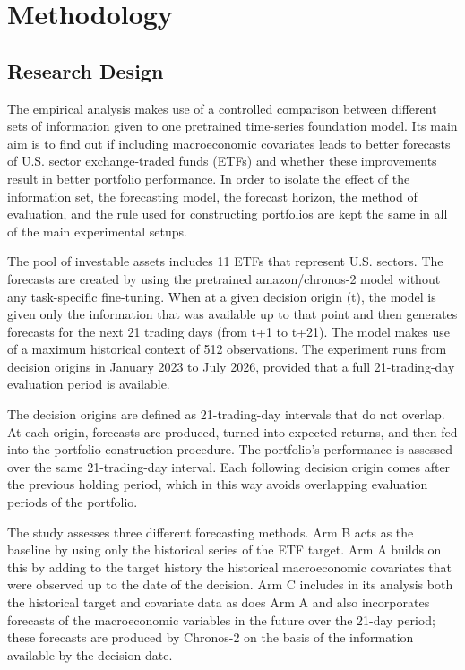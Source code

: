 \documentclass[12pt,a4paper,twoside,openany]{book}
\begin{document}
\chapter{Methodology}\label{methodology}

\section{Research Design}\label{research-design}

The empirical analysis makes use of a controlled comparison between different sets of information given to one pretrained time-series foundation model. Its main aim is to find out if including macroeconomic covariates leads to better forecasts of U.S. sector exchange-traded funds (ETFs) and whether these improvements result in better portfolio performance. In order to isolate the effect of the information set, the forecasting model, the forecast horizon, the method of evaluation, and the rule used for constructing portfolios are kept the same in all of the main experimental setups.

The pool of investable assets includes 11 ETFs that represent U.S. sectors. The forecasts are created by using the pretrained amazon/chronos-2 model without any task-specific fine-tuning. When at a given decision origin (t), the model is given only the information that was available up to that point and then generates forecasts for the next 21 trading days (from t+1 to t+21). The model makes use of a maximum historical context of 512 observations. The experiment runs from decision origins in January 2023 to July 2026, provided that a full 21-trading-day evaluation period is available.

The decision origins are defined as 21-trading-day intervals that do not overlap. At each origin, forecasts are produced, turned into expected returns, and then fed into the portfolio-construction procedure. The portfolio's performance is assessed over the same 21-trading-day interval. Each following decision origin comes after the previous holding period, which in this way avoids overlapping evaluation periods of the portfolio.

The study assesses three different forecasting methods. Arm B acts as the baseline by using only the historical series of the ETF target. Arm A builds on this by adding to the target history the historical macroeconomic covariates that were observed up to the date of the decision. Arm C includes in its analysis both the historical target and covariate data as does Arm A and also incorporates forecasts of the macroeconomic variables in the future over the 21-day period; these forecasts are produced by Chronos-2 on the basis of the information available by the decision date.
\end{document}
